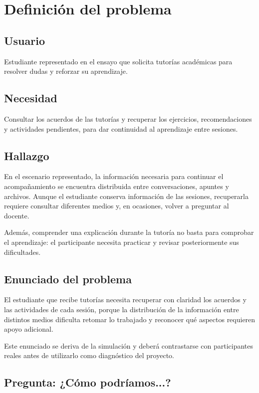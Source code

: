 \documentclass[11pt,a4paper]{article}
\begin{document}
\section{Definición del problema}

\subsection{Usuario}

Estudiante representado en el ensayo que solicita tutorías
académicas para resolver dudas y reforzar su aprendizaje.

\subsection{Necesidad}

Consultar los acuerdos de las tutorías y recuperar los
ejercicios, recomendaciones y actividades pendientes,
para dar continuidad al aprendizaje entre sesiones.

\subsection{Hallazgo}

En el escenario representado, la información necesaria
para continuar el acompañamiento se encuentra distribuida
entre conversaciones, apuntes y archivos. Aunque el estudiante
conserva información de las sesiones, recuperarla requiere
consultar diferentes medios y, en ocasiones, volver
a preguntar al docente.

Además, comprender una explicación durante la tutoría
no basta para comprobar el aprendizaje: el participante
necesita practicar y revisar posteriormente sus dificultades.

\subsection{Enunciado del problema}

El estudiante que recibe tutorías necesita recuperar con
claridad los acuerdos y las actividades de cada sesión,
porque la distribución de la información entre distintos
medios dificulta retomar lo trabajado y reconocer qué
aspectos requieren apoyo adicional.

Este enunciado se deriva de la simulación y deberá
contrastarse con participantes reales antes de utilizarlo
como diagnóstico del proyecto.

\subsection{Pregunta: ¿Cómo podríamos...?}
\end{document}
